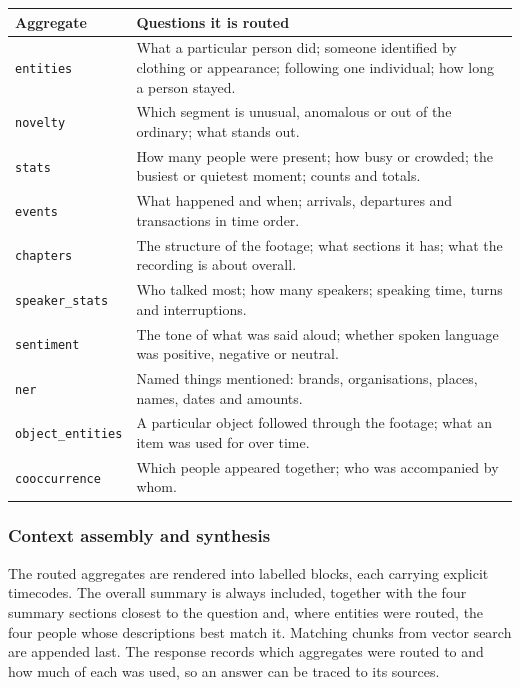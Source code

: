 \begin{table}[htbp]
\centering
\small
\begin{tabularx}{\textwidth}{@{}L{2.9cm}X@{}}
\toprule
\textbf{Aggregate} & \textbf{Questions it is routed} \\
\midrule
\texttt{entities}        & What a particular person did; someone identified by clothing or appearance; following one individual; how long a person stayed. \\
\texttt{novelty}         & Which segment is unusual, anomalous or out of the ordinary; what stands out. \\
\texttt{stats}           & How many people were present; how busy or crowded; the busiest or quietest moment; counts and totals. \\
\texttt{events}          & What happened and when; arrivals, departures and transactions in time order. \\
\texttt{chapters}        & The structure of the footage; what sections it has; what the recording is about overall. \\
\texttt{speaker\_stats}  & Who talked most; how many speakers; speaking time, turns and interruptions. \\
\texttt{sentiment}       & The tone of what was said aloud; whether spoken language was positive, negative or neutral. \\
\texttt{ner}             & Named things mentioned: brands, organisations, places, names, dates and amounts. \\
\texttt{object\_entities}& A particular object followed through the footage; what an item was used for over time. \\
\texttt{cooccurrence}    & Which people appeared together; who was accompanied by whom. \\
\bottomrule
\end{tabularx}
\end{table}

\subsubsection*{Context assembly and synthesis}

The routed aggregates are rendered into labelled blocks, each carrying explicit
timecodes. The overall summary is always included, together with the four summary
sections closest to the question and, where entities were routed, the four people whose
descriptions best match it. Matching chunks from vector search are appended last. The
response records which aggregates were routed to and how much of each was used, so an
answer can be traced to its sources.


